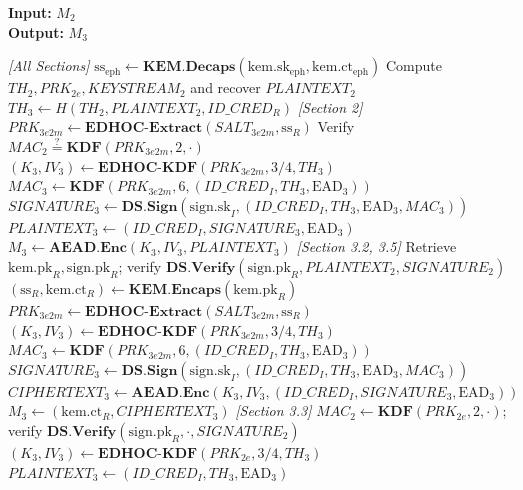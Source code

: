 \documentclass{easychair}
\begin{document}
\begin{algorithm}[H]
\caption{Step 3 (Initiator) --- Process $M_2$ and Prepare $M_3$}
\label{alg:step3}
\textbf{Input:} $M_2$ \\
\textbf{Output:} $M_3$
\begin{algorithmic}[1]
\Statex \textit{[All Sections]}
\State $\mathrm{ss}_{\mathrm{eph}} \gets \mathbf{KEM.Decaps}(\mathrm{kem.sk}_{\mathrm{eph}}, \mathrm{kem.ct}_{\mathrm{eph}})$
\State Compute $TH_2, PRK_{2e}, KEYSTREAM_2$ and recover $PLAINTEXT_2$
\State $TH_3 \gets H(TH_2, PLAINTEXT_2, ID\_CRED_R)$
\Statex \textit{[Section 2]} 
\State $PRK_{3e2m} \gets \mathbf{EDHOC\text{-}Extract}(SALT_{3e2m}, \mathrm{ss}_R)$
\State Verify $MAC_2 \stackrel{?}{=} \mathbf{KDF}(PRK_{3e2m}, 2, \cdot)$
\State $(K_3, IV_3) \gets \mathbf{EDHOC\text{-}KDF}(PRK_{3e2m}, 3\text{/}4, TH_3)$
\State $MAC_3 \gets \mathbf{KDF}(PRK_{3e2m}, 6, (ID\_CRED_I, TH_3, \mathrm{EAD}_3))$
\State $SIGNATURE_3 \gets \mathbf{DS.Sign}(\mathrm{sign.sk}_I, (ID\_CRED_I, TH_3, \mathrm{EAD}_3, MAC_3))$
\State $PLAINTEXT_3 \gets (ID\_CRED_I, SIGNATURE_3, \mathrm{EAD}_3)$
\State $M_3 \gets \mathbf{AEAD.Enc}(K_3, IV_3, PLAINTEXT_3)$
\Statex \textit{[Section 3.2, 3.5]} 
\State Retrieve $\mathrm{kem.pk}_R, \mathrm{sign.pk}_R$; verify $\mathbf{DS.Verify}(\mathrm{sign.pk}_R, PLAINTEXT_2, SIGNATURE_2)$
\State $(\mathrm{ss}_R, \mathrm{kem.ct}_R) \gets \mathbf{KEM.Encaps}(\mathrm{kem.pk}_R)$
\State $PRK_{3e2m} \gets \mathbf{EDHOC\text{-}Extract}(SALT_{3e2m}, \mathrm{ss}_R)$
\State $(K_3, IV_3) \gets \mathbf{EDHOC\text{-}KDF}(PRK_{3e2m}, 3\text{/}4, TH_3)$
\State $MAC_3 \gets \mathbf{KDF}(PRK_{3e2m}, 6, (ID\_CRED_I, TH_3, \mathrm{EAD}_3))$
\State $SIGNATURE_3 \gets \mathbf{DS.Sign}(\mathrm{sign.sk}_I, (ID\_CRED_I, TH_3, \mathrm{EAD}_3, MAC_3))$
\State $CIPHERTEXT_3 \gets \mathbf{AEAD.Enc}(K_3, IV_3, (ID\_CRED_I, SIGNATURE_3, \mathrm{EAD}_3))$
\State $M_3 \gets (\mathrm{kem.ct}_R, CIPHERTEXT_3)$
\Statex \textit{[Section 3.3]} 
\State $MAC_2 \gets \mathbf{KDF}(PRK_{2e}, 2, \cdot)$; verify $\mathbf{DS.Verify}(\mathrm{sign.pk}_R, \cdot, SIGNATURE_2)$
\State $(K_3, IV_3) \gets \mathbf{EDHOC\text{-}KDF}(PRK_{2e}, 3\text{/}4, TH_3)$
\State $PLAINTEXT_3 \gets (ID\_CRED_I, TH_3, \mathrm{EAD}_3)$

\end{algorithmic}
\end{algorithm}
\end{document}
